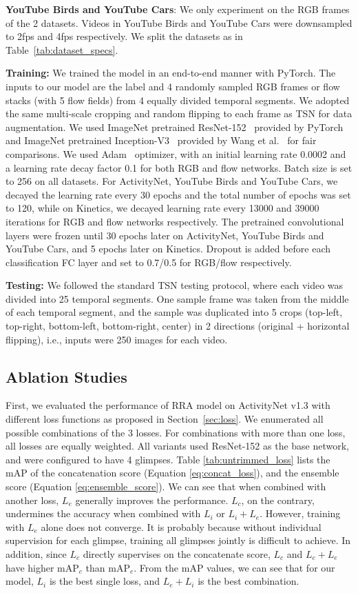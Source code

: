 \documentclass[runningheads]{llncs}
\begin{document}
\textbf{YouTube Birds and YouTube Cars}: We only experiment on the RGB frames of the 2 datasets. Videos in YouTube Birds and YouTube Cars were downsampled to 2fps and 4fps respectively. We split the datasets as in Table~\ref{tab:dataset_specs}.

\textbf{Training:} We trained the model in an end-to-end manner with PyTorch. The inputs to our model are the label and 4 randomly sampled RGB frames or flow stacks (with 5 flow fields) from 4 equally divided temporal segments. We adopted the same multi-scale cropping and random flipping to each frame as TSN for data augmentation. We used ImageNet pretrained ResNet-152~\cite{he2016deep} provided by PyTorch and ImageNet pretrained Inception-V3~\cite{szegedy2016rethinking} provided by Wang et al.~\cite{wang2016temporal} for fair comparisons. We used Adam~\cite{kingma2014adam} optimizer, with an initial learning rate 0.0002 and a learning rate decay factor 0.1 for both RGB and flow networks. Batch size is set to 256 on all datasets. For ActivityNet, YouTube Birds and YouTube Cars, we decayed the learning rate every 30 epochs and the total number of epochs was set to 120, while on Kinetics, we decayed learning rate every 13000 and 39000 iterations for RGB and flow networks respectively. The pretrained convolutional layers were frozen until 30 epochs later on ActivityNet, YouTube Birds and YouTube Cars, and 5 epochs later on Kinetics. Dropout is added before each classification FC layer and set to 0.7/0.5 for RGB/flow respectively.

\textbf{Testing:}
We followed the standard TSN testing protocol, where each video was divided into 25 temporal segments.
One sample frame was taken from the middle of each temporal segment, and the sample was duplicated into 5 crops (top-left, top-right, bottom-left, bottom-right, center) in 2 directions (original + horizontal flipping), i.e., inputs were 250 images for each video. 

\subsection{Ablation Studies}
First, we evaluated the performance of RRA model on ActivityNet v1.3 with different loss functions as proposed in Section~\ref{sec:loss}.
We enumerated all possible combinations of the 3 losses.
For combinations with more than one loss, all losses are equally weighted.
All variants used ResNet-152 as the base network, and were configured to have 4 glimpses.
Table \ref{tab:untrimmed_loss} lists the mAP of the concatenation score (Equation \ref{eq:concat_loss}), and the ensemble score (Equation \ref{eq:ensemble_score}).
We can see that when combined with another loss, $L_e$ generally improves the performance. $L_c$, on the contrary, undermines the accuracy when combined with $L_i$ or $L_i+L_e$. However, training with $L_e$ alone does not converge. It is probably because without individual supervision for each glimpse, training all glimpses jointly is difficult to achieve. In addition, since $L_c$ directly supervises on the concatenate score, $L_c$ and $L_c+L_e$ have higher $\mathrm{mAP}_c$ than $\mathrm{mAP}_e$. From the mAP values, we can see that for our model, $L_i$ is the best single loss, and $L_e+L_i$ is the best combination.
\end{document}
